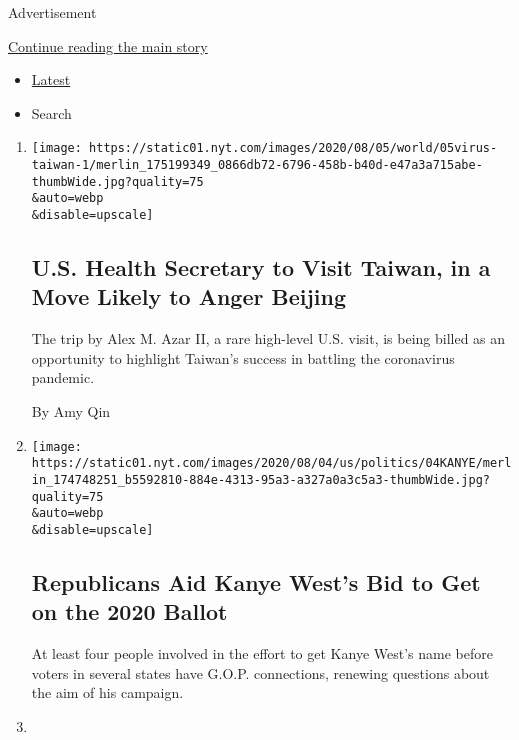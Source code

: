 Advertisement

\protect\hyperlink{after-mid1}{Continue reading the main story}

\begin{itemize}
\tightlist
\item
  \protect\hyperlink{stream-panel}{Latest}
\item
  Search
\end{itemize}

\begin{enumerate}
\def\labelenumi{\arabic{enumi}.}
\item
  \href{/2020/08/04/world/asia/taiwan-azar-beijing-coronavirus.html}{}

  \texttt{[image: https://static01.nyt.com/images/2020/08/05/world/05virus-taiwan-1/merlin\_175199349\_0866db72-6796-458b-b40d-e47a3a715abe-thumbWide.jpg?quality=75\\\&auto=webp\\\&disable=upscale]}

  \hypertarget{us-health-secretary-to-visit-taiwan-in-a-move-likely-to-anger-beijing}{%
  \subsection{U.S. Health Secretary to Visit Taiwan, in a Move Likely to
  Anger
  Beijing}\label{us-health-secretary-to-visit-taiwan-in-a-move-likely-to-anger-beijing}}

  The trip by Alex M. Azar II, a rare high-level U.S. visit, is being
  billed as an opportunity to highlight Taiwan's success in battling the
  coronavirus pandemic.

  By Amy Qin
\item
  \href{/2020/08/04/us/politics/kanye-west-president-republicans.html}{}

  \texttt{[image: https://static01.nyt.com/images/2020/08/04/us/politics/04KANYE/merlin\_174748251\_b5592810-884e-4313-95a3-a327a0a3c5a3-thumbWide.jpg?quality=75\\\&auto=webp\\\&disable=upscale]}

  \hypertarget{republicans-aid-kanye-wests-bid-to-get-on-the-2020-ballot}{%
  \subsection{Republicans Aid Kanye West's Bid to Get on the 2020
  Ballot}\label{republicans-aid-kanye-wests-bid-to-get-on-the-2020-ballot}}

  At least four people involved in the effort to get Kanye West's name
  before voters in several states have G.O.P. connections, renewing
  questions about the aim of his campaign.
\item
  \href{/2020/08/04/us/politics/coronavirus-recovery-plan-negotiations.html}{}


\end{enumerate}

